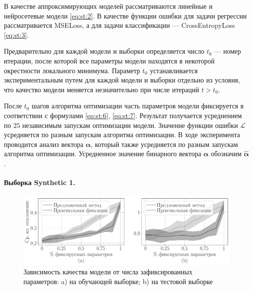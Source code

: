 В качестве аппроксимирующих моделей рассматриваются линейные и нейросетевые модели \eqref{eq:st:2}. В качестве функции ошибки для задачи регрессии рассматривается MSELoss, а для задачи классификации --- CrossEntropyLoss \eqref{eq:st:3}.

Предварительно для каждой модели и выборки определяется число $t_0$ --- номер итерации, после которой все параметры модели находятся в некоторой окрестности локального минимума. Параметр $t_0$ устанавливается экспериментальным путем для каждой модели и выборки отдельно из условия, что качество модели меняется незначительно при числе итераций $t>t_0$.

После $t_0$ шагов алгоритма оптимизации часть параметров модели фиксируется в соответствии с формулами \eqref{eq:st:6}, \eqref{eq:st:7}. Результат получается усреднением по $25$ независимым запускам оптимизации модели. Значение функции ошибки $\mathcal{L}$ усредняется по разным запускам алгоритма оптимизации. В ходе эксперимента проводится анализ вектора $\bm{\alpha}$, который также усредняется по разным запускам алгоритма оптимизации. Усредненное значение бинарного вектора  $\bm{\alpha}$ обозначим $\hat{\bm{\alpha}}$.


\paragraph{Выборка Synthetic 1.}

\begin{figure}[h!t]\center
\includegraphics[width=1\textwidth]{results/order/generate_data_neural_loss}
\caption{Зависимость качества модели от числа зафиксированных параметров: a) на обучающей выборке; b) на тестовой выборке}
\label{fg:ex:syn3:1}
\end{figure}

